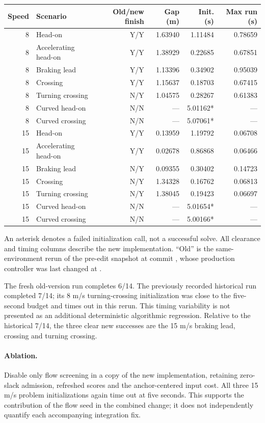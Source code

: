 \documentclass[11pt]{article}
\begin{document}
\begin{center}\small
\begin{tabular}{rlrrrr}
\toprule
Speed & Scenario & Old/new finish & Gap (m) & Init. (s) & Max run (s)\\
\midrule
8 & Head-on & Y/Y & 1.63940 & 1.11484 & 0.78659\\
8 & Accelerating head-on & Y/Y & 1.38929 & 0.22685 & 0.67851\\
8 & Braking lead & Y/Y & 1.13396 & 0.34902 & 0.95039\\
8 & Crossing & Y/Y & 1.15637 & 0.18703 & 0.67415\\
8 & Turning crossing & N/Y & 1.04575 & 0.28267 & 0.61383\\
8 & Curved head-on & N/N & --- & 5.01162* & ---\\
8 & Curved crossing & N/N & --- & 5.07061* & ---\\
15 & Head-on & Y/Y & 0.13959 & 1.19792 & 0.06708\\
15 & Accelerating head-on & Y/Y & 0.02678 & 0.86868 & 0.06466\\
15 & Braking lead & N/Y & 0.09355 & 0.30402 & 0.14723\\
15 & Crossing & N/Y & 1.34328 & 0.16762 & 0.06813\\
15 & Turning crossing & N/Y & 1.38045 & 0.19423 & 0.06697\\
15 & Curved head-on & N/N & --- & 5.01654* & ---\\
15 & Curved crossing & N/N & --- & 5.00166* & ---\\
\bottomrule
\end{tabular}
\end{center}
An asterisk denotes a failed initialization call, not a successful solve.
All clearance and timing columns describe the new implementation. ``Old''
is the same-environment rerun of the pre-edit snapshot at commit
, whose production controller
was last changed at .

The fresh old-version run completes 6/14. The previously recorded historical
run completed 7/14; its 8 m/s turning-crossing initialization was close to the
five-second budget and times out in this rerun. This timing variability is
not presented as an additional deterministic algorithmic regression. Relative
to the historical 7/14, the three clear new successes are the 15 m/s braking
lead, crossing and turning crossing.

\paragraph{Ablation.}
Disable only flow screening in a copy of the new implementation, retaining
zero-slack admission, refreshed scores and the anchor-centered input cost.
All three 15 m/s problem initializations again time out at five seconds.
This supports the contribution of the flow seed in the combined change;
it does not independently quantify each accompanying integration fix.
\end{document}
